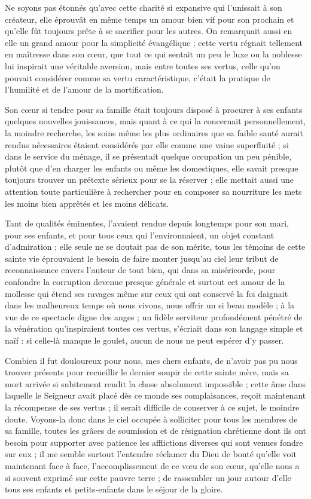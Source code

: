 \documentclass[11pt,a4paper]{report}
\begin{document}
Ne soyons pas étonnés qu'avec cette charité si expansive qui l'unissait à son créateur, elle éprouvât en même temps un amour bien vif pour son prochain et qu'elle fût toujours prête à se sacrifier pour les autres. On remarquait aussi en elle un grand amour pour la simplicité évangélique ; cette vertu régnait tellement en maîtresse dans son cœur, que tout ce qui sentait un peu le luxe ou la noblesse lui inspirait une véritable aversion, mais entre toutes ses vertus, celle qu'on pouvait considérer comme sa vertu caractéristique, c'était la pratique de l'humilité et de l'amour de la mortification.

Son cœur si tendre pour sa famille était toujours disposé à procurer à ses enfants quelques nouvelles jouissances, mais quant à ce qui la concernait personnellement, la moindre recherche, les soins même les plus ordinaires que sa faible santé aurait rendus nécessaires étaient considérés par elle comme une vaine superfluité ; si dans le service du ménage, il se présentait quelque occupation un peu pénible, plutôt que d'en charger les enfants ou même les domestiques, elle savait presque toujours trouver un prétexte sérieux pour se la réserver ; elle mettait aussi une attention toute particulière à rechercher pour en composer sa nourriture les mets les moins bien apprêtés et les moins délicats.

Tant de qualités éminentes, l'avaient rendue depuis longtemps pour son mari, pour ses enfants, et pour tous ceux qui l'environnaient, un objet constant d'admiration ; elle seule ne se doutait pas de son mérite, tous les témoins de cette sainte vie éprouvaient le besoin de faire monter jusqu'au ciel leur tribut de reconnaissance envers l'auteur de tout bien, qui dans sa miséricorde, pour confondre la corruption devenue presque générale et surtout cet amour de la mollesse qui étend ses ravages même sur ceux qui ont conservé la foi daignait dans les malheureux temps où nous vivons, nous offrir un si beau modèle ; à la vue de ce spectacle digne des anges ; un fidèle serviteur profondément pénétré de la vénération qu'inspiraient toutes ces vertus, s'écriait dans son langage simple et naïf : si celle-là manque le goulet, aucun de nous ne peut espérer d'y passer.

Combien il fut douloureux pour nous, mes chers enfants, de n'avoir pas pu nous trouver présents pour recueillir le dernier soupir de cette sainte mère, mais sa mort arrivée si subitement rendit la chose absolument impossible ; cette âme dans laquelle le Seigneur avait placé dès ce monde ses complaisances, reçoit maintenant la récompense de ses vertus ; il serait difficile de conserver à ce sujet, le moindre doute. Voyons-la donc dans le ciel occupée à solliciter pour tous les membres de sa famille, toutes les grâces de soumission et de résignation chrétienne dont ils ont besoin pour supporter avec patience les afflictions diverses qui sont venues fondre sur eux ; il me semble surtout l'entendre réclamer du Dieu de bonté qu'elle voit maintenant face à face, l'accomplissement de ce vœu de son cœur, qu'elle nous a si souvent exprimé sur cette pauvre terre ; de rassembler un jour autour d'elle tous ses enfants et petits-enfants dans le séjour de la gloire.
\end{document}
